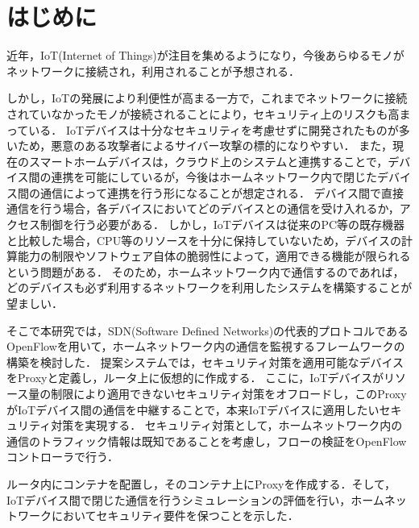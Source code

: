 \documentclass[Japanese]{dicomopapers}
\begin{document}
\section{はじめに}
近年，IoT(Internet of Things)が注目を集めるようになり，今後あらゆるモノがネットワークに接続され，利用されることが予想される．\par
しかし，IoTの発展により利便性が高まる一方で，これまでネットワークに接続されていなかったモノが接続されることにより，セキュリティ上のリスクも高まっている\cite{guideline}．
IoTデバイスは十分なセキュリティを考慮せずに開発されたものが多いため，悪意のある攻撃者によるサイバー攻撃の標的になりやすい．
また，現在のスマートホームデバイスは，クラウド上のシステムと連携することで，デバイス間の連携を可能にしているが，今後はホームネットワーク内で閉じたデバイス間の通信によって連携を行う形になることが想定される．
デバイス間で直接通信を行う場合，各デバイスにおいてどのデバイスとの通信を受け入れるか，アクセス制御を行う必要がある．
しかし，IoTデバイスは従来のPC等の既存機器と比較した場合，CPU等のリソースを十分に保持していないため，デバイスの計算能力の制限やソフトウェア自体の脆弱性によって，適用できる機能が限られるという問題がある．
そのため，ホームネットワーク内で通信するのであれば，どのデバイスも必ず利用するネットワークを利用したシステムを構築することが望ましい．\par
そこで本研究では，SDN(Software Defined Networks)の代表的プロトコルであるOpenFlowを用いて，ホームネットワーク内の通信を監視するフレームワークの構築を検討した．
提案システムでは，セキュリティ対策を適用可能なデバイスをProxyと定義し，ルータ上に仮想的に作成する．
ここに，IoTデバイスがリソース量の制限により適用できないセキュリティ対策をオフロードし，このProxyがIoTデバイス間の通信を中継することで，本来IoTデバイスに適用したいセキュリティ対策を実現する．
セキュリティ対策として，ホームネットワーク内の通信のトラフィック情報は既知であることを考慮し，フローの検証をOpenFlowコントローラで行う．\par
ルータ内にコンテナを配置し，そのコンテナ上にProxyを作成する．そして，IoTデバイス間で閉じた通信を行うシミュレーションの評価を行い，ホームネットワークにおいてセキュリティ要件を保つことを示した．
\end{document}
